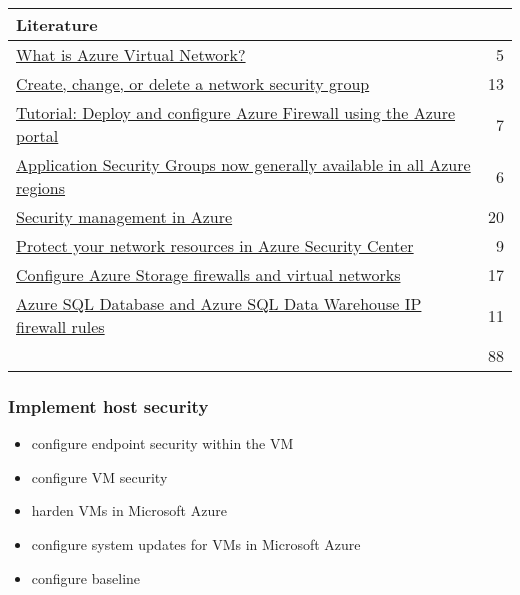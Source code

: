 \begin{tabular}{p{14cm} | r}
\textbf{Literature} & \\
\hline
\href{https://docs.microsoft.com/en-us/azure/virtual-network/virtual-networks-overview}{What is Azure Virtual Network?} & 5 \\
\href{https://docs.microsoft.com/en-us/azure/virtual-network/manage-network-security-group}{Create, change, or delete a network security group} & 13 \\
\href{https://docs.microsoft.com/en-us/azure/firewall/tutorial-firewall-deploy-portal}{Tutorial: Deploy and configure Azure Firewall using the Azure portal} & 7 \\
\href{https://azure.microsoft.com/en-gb/blog/applicationsecuritygroups/}{Application Security Groups now generally available in all Azure regions} & 6 \\
\href{https://docs.microsoft.com/en-us/azure/security/fundamentals/management}{Security management in Azure} & 20 \\
\href{https://docs.microsoft.com/en-us/azure/security-center/security-center-network-recommendations}{Protect your network resources in Azure Security Center} & 9 \\
\href{https://docs.microsoft.com/en-us/azure/storage/common/storage-network-security}{Configure Azure Storage firewalls and virtual networks} & 17 \\
\href{https://docs.microsoft.com/en-us/azure/sql-database/sql-database-firewall-configure}{Azure SQL Database and Azure SQL Data Warehouse IP firewall rules} & 11 \\
\cline{2-2} 
 & 88 \\
\end{tabular}

\subsubsection{Implement host security}
\begin{itemize}
\item configure endpoint security within the VM 
\item configure VM security 
\item harden VMs in Microsoft Azure 
\item configure system updates for VMs in Microsoft Azure 
\item configure baseline 
\end{itemize}

